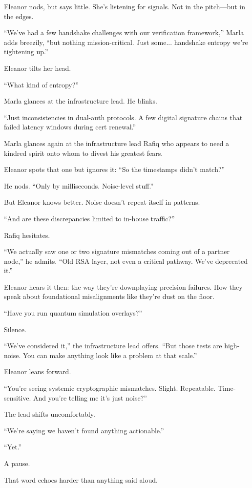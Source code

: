 Eleanor nods, but says little.
She’s listening for signals. Not in the pitch—but in the edges.

“We’ve had a few handshake challenges with our verification framework,” Marla adds breezily, “but nothing mission-critical. Just some... handshake entropy we’re tightening up.”

Eleanor tilts her head.

“What kind of entropy?”

Marla glances at the infrastructure lead. He blinks.

“Just inconsistencies in dual-auth protocols. A few digital signature chains that failed latency windows during cert renewal.”

Marla glances again at the infrastructure lead Rafiq who appears to need a kindred spirit onto whom to divest his greatest fears.

Eleanor spots that one but ignores it: “So the timestamps didn’t match?”

He nods. “Only by milliseconds. Noise-level stuff.” 

But Eleanor knows better. Noise doesn’t repeat itself in patterns.

“And are these discrepancies limited to in-house traffic?”

Rafiq hesitates.

“We actually saw one or two signature mismatches coming out of a partner node,” he admits. “Old RSA layer, not even a critical pathway. We’ve deprecated it.”

Eleanor hears it then: the way they’re downplaying precision failures. How they speak about foundational misalignments like they’re dust on the floor.

“Have you run quantum simulation overlays?”

Silence.

“We’ve considered it,” the infrastructure lead offers. “But those tests are high-noise. You can make anything look like a problem at that scale.”

Eleanor leans forward.

“You’re seeing systemic cryptographic mismatches. Slight. Repeatable. Time-sensitive. And you’re telling me it’s just noise?”

The lead shifts uncomfortably.

“We’re saying we haven’t found anything actionable.”

“Yet.”

A pause.

That word echoes harder than anything said aloud.

